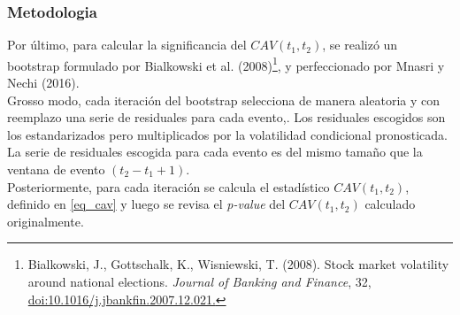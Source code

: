 \documentclass{beamer}
\begin{document}
\begin{frame}
\frametitle{Metodologia}
Por último, para calcular la significancia del $CAV(t_1,t_2)$, se realizó un bootstrap formulado por Bialkowski et al. (2008)\footnote{Bialkowski, J., Gottschalk, K., Wisniewski, T. (2008).
Stock market volatility around national elections.
\textit{Journal of Banking and Finance}, 32, \href{
https://doi.org/10.1016/j.jbankfin.2007.12.021
}{doi:10.1016/j.jbankfin.2007.12.021.}}, y perfeccionado por Mnasri y Nechi (2016).\\
Grosso modo, cada iteración del bootstrap selecciona de manera aleatoria y con reemplazo una serie de residuales para cada evento,. Los residuales escogidos son los estandarizados pero multiplicados por la volatilidad condicional pronosticada. La serie de residuales escogida para cada evento es del mismo tamaño que la ventana de evento $(t_2-t_1+1)$.\\
Posteriormente, para cada iteración se calcula el estadístico $CAV(t_1,t_2)$, definido en \eqref{eq_cav} y luego se revisa el \textit{p-value} del $CAV(t_1,t_2)$ calculado originalmente.
\end{frame}
\end{document}
